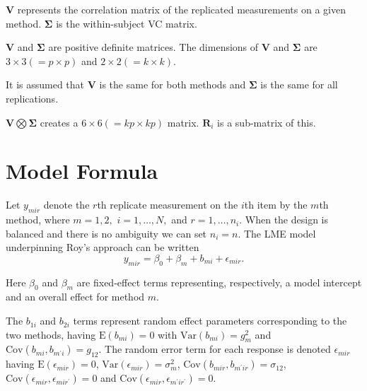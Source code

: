 \documentclass[12pt, a4paper]{report}
\theoremstyle{plain}
\theoremstyle{definition}
\theoremstyle{remark}
\begin{document}
$\boldsymbol{V}$ represents the correlation matrix of the replicated measurements on a given method.
$\boldsymbol{\Sigma}$ is the within-subject VC matrix.\\
\bigskip


$\boldsymbol{V}$ and $\boldsymbol{\Sigma}$ are positive
definite matrices. The dimensions of $\boldsymbol{V}$ and
$\boldsymbol{\Sigma}$ are $3 \times 3 ( = p \times p )$ and $ 2 \times
2 (= k \times k)$.\\
\bigskip


It is assumed that $\boldsymbol{V}$ is the same for both methods and $\boldsymbol{\Sigma}$ is
the same for all replications.\\
\bigskip

$\boldsymbol{V} \bigotimes \boldsymbol{\Sigma}$ creates a $ 6 \times 6 ( = kp \times
kp)$ matrix.
$\boldsymbol{R}_{i}$ is a sub-matrix of this.\\
\bigskip



\section{Model Formula}

Let $y_{mir} $ denote the $r$th replicate measurement on the $i$th item by the $m$th method, where $m=1,2,$ $i=1,\ldots,N,$ and $r = 1,\ldots,n_i.$ When the design is balanced and there is no ambiguity we can set $n_i=n.$ The LME model underpinning Roy's approach can be written
\begin{equation}\label{Roy-model}
y_{mir} = \beta_{0} + \beta_{m} + b_{mi} + \epsilon_{mir}.
\end{equation}

Here $\beta_0$ and $\beta_m$ are fixed-effect terms representing, respectively, a model intercept and an overall effect for method $m.$ 


The $b_{1i}$ and $b_{2i}$ terms represent random effect parameters corresponding to the two methods, having $\mathrm{E}(b_{mi})=0$ with $\mathrm{Var}(b_{mi})=g^2_m$ and $\mathrm{Cov}(b_{mi}, b_{m^\prime i})=g_{12}.$ The random error term for each response is denoted $\epsilon_{mir}$ having $\mathrm{E}(\epsilon_{mir})=0$, $\mathrm{Var}(\epsilon_{mir})=\sigma^2_m$, $\mathrm{Cov}(b_{mir}, b_{m^\prime ir})=\sigma_{12}$, $\mathrm{Cov}(\epsilon_{mir}, \epsilon_{mir^\prime})= 0$ and $\mathrm{Cov}(\epsilon_{mir}, \epsilon_{m^\prime ir^\prime})= 0.$
\end{document}
